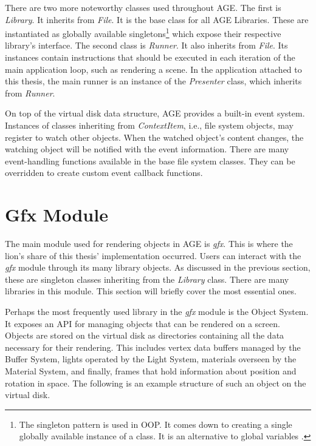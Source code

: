 \documentclass[
  digital,     %
  oneside,     %
  nosansbold,  %
  nocolorbold, %
  lof,         %
  lot,         %
]{fithesis4}
\begin{document}
There are two more noteworthy classes used throughout AGE. The first is \textit{Library}. It inherits from
\textit{File}. It is the base class for all AGE Libraries. These are instantiated as globally available
singletons\footnote{The singleton pattern is used in OOP. It comes down to creating a single globally
available instance of a class. It is an alternative to global variables \cite{singleton}.}
which expose their respective library's interface. The second class is \textit{Runner}. It also
inherits from \textit{File}. Its instances contain instructions that should be executed
in each iteration of the main application loop, such as rendering a scene. In the application
attached to this thesis, the main runner is an instance of the \textit{Presenter} class,
which inherits from \textit{Runner}.

On top of the virtual disk data structure, AGE provides a built-in event system.
Instances of classes inheriting from \textit{ContextItem}, i.e., file system objects,
may register to watch other objects. When the watched object's content changes, the
watching object will be notified with the event information. There are many event-handling
functions available in the base file system classes. They can be overridden
to create custom event callback functions.

\section{Gfx Module}
The main module used for rendering objects in AGE is \textit{gfx}.
This is where the lion's share of this thesis' implementation occurred. Users can interact with the
\textit{gfx} module through its many library objects. As discussed in the previous section,
these are singleton classes inheriting from the \textit{Library} class. There are many
libraries in this module. This section will briefly cover the most essential ones.

Perhaps the most frequently used library in the \textit{gfx} module is the Object System.
It exposes an API for managing objects that can be rendered on a screen.
Objects are stored on the virtual disk as directories containing all the data
necessary for their rendering. This includes vertex data buffers managed by the Buffer System,
lights operated by the Light System, materials overseen by the Material System, and finally, frames that
hold information about position and rotation in space.
The following is an example structure of such an object on the virtual disk.
\end{document}
